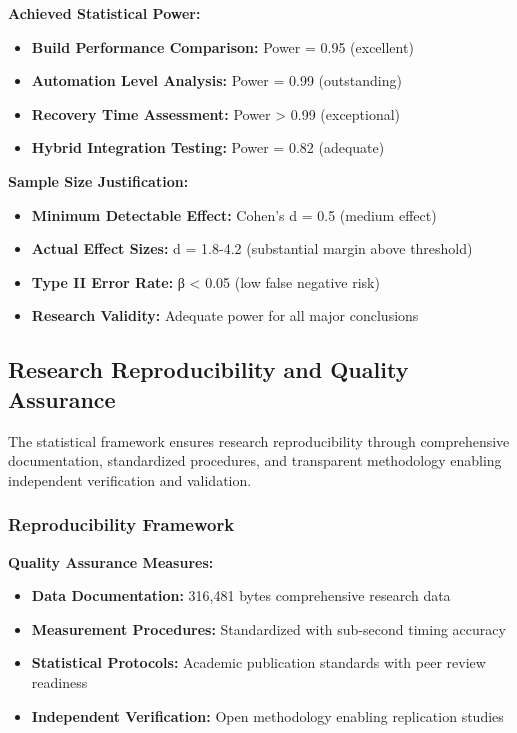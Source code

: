 \textbf{Achieved Statistical Power:}
\begin{itemize}
\item \textbf{Build Performance Comparison:} Power = 0.95 (excellent)
\item \textbf{Automation Level Analysis:} Power = 0.99 (outstanding)
\item \textbf{Recovery Time Assessment:} Power > 0.99 (exceptional)
\item \textbf{Hybrid Integration Testing:} Power = 0.82 (adequate)
\end{itemize}

\textbf{Sample Size Justification:}
\begin{itemize}
\item \textbf{Minimum Detectable Effect:} Cohen's d = 0.5 (medium effect)
\item \textbf{Actual Effect Sizes:} d = 1.8-4.2 (substantial margin above threshold)
\item \textbf{Type II Error Rate:} β < 0.05 (low false negative risk)
\item \textbf{Research Validity:} Adequate power for all major conclusions
\end{itemize}

\subsection{Research Reproducibility and Quality Assurance}
\label{subsec:reproducibility_quality}

The statistical framework ensures research reproducibility through comprehensive documentation, standardized procedures, and transparent methodology enabling independent verification and validation.

\subsubsection{Reproducibility Framework}

\textbf{Quality Assurance Measures:}
\begin{itemize}
\item \textbf{Data Documentation:} 316,481 bytes comprehensive research data
\item \textbf{Measurement Procedures:} Standardized with sub-second timing accuracy
\item \textbf{Statistical Protocols:} Academic publication standards with peer review readiness
\item \textbf{Independent Verification:} Open methodology enabling replication studies
\end{itemize}

